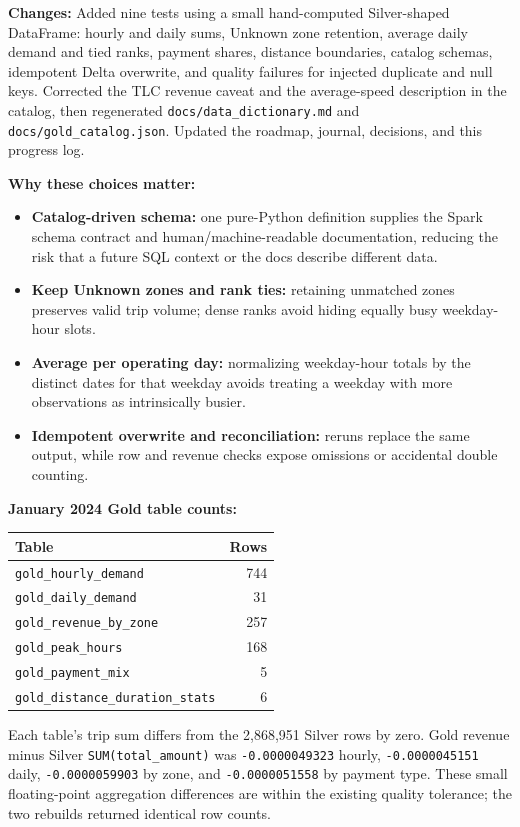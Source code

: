 \documentclass[11pt,a4paper]{article}
\begin{document}
\textbf{Changes:} Added nine tests using a small hand-computed Silver-shaped
DataFrame: hourly and daily sums, Unknown zone retention, average daily demand
and tied ranks, payment shares, distance boundaries, catalog schemas,
idempotent Delta overwrite, and quality failures for injected duplicate and
null keys. Corrected the TLC revenue caveat and the average-speed description
in the catalog, then regenerated \texttt{docs/data\_dictionary.md} and
\texttt{docs/gold\_catalog.json}. Updated the roadmap, journal, decisions, and
this progress log.

\textbf{Why these choices matter:}
\begin{itemize}
  \item \textbf{Catalog-driven schema:} one pure-Python definition supplies the
        Spark schema contract and human/machine-readable documentation, reducing
        the risk that a future SQL context or the docs describe different data.
  \item \textbf{Keep Unknown zones and rank ties:} retaining unmatched zones
        preserves valid trip volume; dense ranks avoid hiding equally busy
        weekday-hour slots.
  \item \textbf{Average per operating day:} normalizing weekday-hour totals by
        the distinct dates for that weekday avoids treating a weekday with more
        observations as intrinsically busier.
  \item \textbf{Idempotent overwrite and reconciliation:} reruns replace the
        same output, while row and revenue checks expose omissions or accidental
        double counting.
\end{itemize}

\textbf{January 2024 Gold table counts:}
\begin{center}
\begin{tabular}{lr}
\hline
Table & Rows \\
\hline
\texttt{gold\_hourly\_demand} & 744 \\
\texttt{gold\_daily\_demand} & 31 \\
\texttt{gold\_revenue\_by\_zone} & 257 \\
\texttt{gold\_peak\_hours} & 168 \\
\texttt{gold\_payment\_mix} & 5 \\
\texttt{gold\_distance\_duration\_stats} & 6 \\
\hline
\end{tabular}
\end{center}
Each table's trip sum differs from the 2,868,951 Silver rows by zero. Gold
revenue minus Silver \texttt{SUM(total\_amount)} was
\texttt{-0.0000049323} hourly, \texttt{-0.0000045151} daily,
\texttt{-0.0000059903} by zone, and \texttt{-0.0000051558} by payment type.
These small floating-point aggregation differences are within the existing
quality tolerance; the two rebuilds returned identical row counts.
\end{document}
